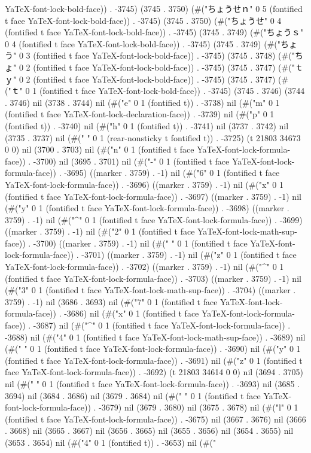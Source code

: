 YaTeX-font-lock-bold-face)) . -3745) (3745 . 3750) (#("ちょうせｎ" 0 5 (fontified t face YaTeX-font-lock-bold-face)) . -3745) (3745 . 3750) (#("ちょうせ" 0 4 (fontified t face YaTeX-font-lock-bold-face)) . -3745) (3745 . 3749) (#("ちょうｓ" 0 4 (fontified t face YaTeX-font-lock-bold-face)) . -3745) (3745 . 3749) (#("ちょう" 0 3 (fontified t face YaTeX-font-lock-bold-face)) . -3745) (3745 . 3748) (#("ちょ" 0 2 (fontified t face YaTeX-font-lock-bold-face)) . -3745) (3745 . 3747) (#("ｔｙ" 0 2 (fontified t face YaTeX-font-lock-bold-face)) . -3745) (3745 . 3747) (#("ｔ" 0 1 (fontified t face YaTeX-font-lock-bold-face)) . -3745) (3745 . 3746) (3744 . 3746) nil (3738 . 3744) nil (#("e" 0 1 (fontified t)) . -3738) nil (#("m" 0 1 (fontified t face YaTeX-font-lock-declaration-face)) . -3739) nil (#("p" 0 1 (fontified t)) . -3740) nil (#("h" 0 1 (fontified t)) . -3741) nil (3737 . 3742) nil (3735 . 3737) nil (#("
" 0 1 (rear-nonsticky t fontified t)) . -3725) (t 21803 34673 0 0) nil (3700 . 3703) nil (#("n" 0 1 (fontified t face YaTeX-font-lock-formula-face)) . -3700) nil (3695 . 3701) nil (#("-" 0 1 (fontified t face YaTeX-font-lock-formula-face)) . -3695) ((marker . 3759) . -1) nil (#("6" 0 1 (fontified t face YaTeX-font-lock-formula-face)) . -3696) ((marker . 3759) . -1) nil (#("x" 0 1 (fontified t face YaTeX-font-lock-formula-face)) . -3697) ((marker . 3759) . -1) nil (#("y" 0 1 (fontified t face YaTeX-font-lock-formula-face)) . -3698) ((marker . 3759) . -1) nil (#("^" 0 1 (fontified t face YaTeX-font-lock-formula-face)) . -3699) ((marker . 3759) . -1) nil (#("2" 0 1 (fontified t face YaTeX-font-lock-math-sup-face)) . -3700) ((marker . 3759) . -1) nil (#(" " 0 1 (fontified t face YaTeX-font-lock-formula-face)) . -3701) ((marker . 3759) . -1) nil (#("z" 0 1 (fontified t face YaTeX-font-lock-formula-face)) . -3702) ((marker . 3759) . -1) nil (#("^" 0 1 (fontified t face YaTeX-font-lock-formula-face)) . -3703) ((marker . 3759) . -1) nil (#("3" 0 1 (fontified t face YaTeX-font-lock-math-sup-face)) . -3704) ((marker . 3759) . -1) nil (3686 . 3693) nil (#("7" 0 1 (fontified t face YaTeX-font-lock-formula-face)) . -3686) nil (#("x" 0 1 (fontified t face YaTeX-font-lock-formula-face)) . -3687) nil (#("^" 0 1 (fontified t face YaTeX-font-lock-formula-face)) . -3688) nil (#("4" 0 1 (fontified t face YaTeX-font-lock-math-sup-face)) . -3689) nil (#(" " 0 1 (fontified t face YaTeX-font-lock-formula-face)) . -3690) nil (#("y" 0 1 (fontified t face YaTeX-font-lock-formula-face)) . -3691) nil (#("z" 0 1 (fontified t face YaTeX-font-lock-formula-face)) . -3692) (t 21803 34614 0 0) nil (3694 . 3705) nil (#(" " 0 1 (fontified t face YaTeX-font-lock-formula-face)) . -3693) nil (3685 . 3694) nil (3684 . 3686) nil (3679 . 3684) nil (#(" " 0 1 (fontified t face YaTeX-font-lock-formula-face)) . -3679) nil (3679 . 3680) nil (3675 . 3678) nil (#("l" 0 1 (fontified t face YaTeX-font-lock-formula-face)) . -3675) nil (3667 . 3676) nil (3666 . 3668) nil (3665 . 3667) nil (3656 . 3665) nil (3655 . 3656) nil (3654 . 3655) nil (3653 . 3654) nil (#("4" 0 1 (fontified t)) . -3653) nil (#("
